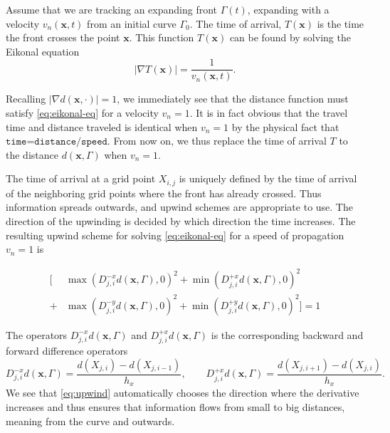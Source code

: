 \begin{definition}
Assume that we are tracking an expanding front $\Gamma(t)$, expanding with a velocity $v_n(\mathbf{x}, t)$ from an initial curve $\Gamma_0$. The time of arrival, $T(\mathbf{x})$ is the time the front crosses the point $\mathbf{x}$. This function $T(\mathbf{x})$ can be found by solving the Eikonal equation \cite{sethian1999level}
\begin{equation}
    |\nabla T(\mathbf{x})| = \frac{1}{v_n(\mathbf{x}, t)}. 
    \label{eq:eikonal-eq}
\end{equation}
\end{definition}
Recalling $|\nabla d(\mathbf{x}, \cdot) | = 1$, we immediately see that the distance function must satisfy \eqref{eq:eikonal-eq} for a velocity $v_n=1$. It is in fact obvious that the travel time and distance traveled is identical when $v_n=1$ by the physical fact that $\texttt{time=distance/speed}$. From now on, we thus replace the time of arrival $T$ to the distance $d(\mathbf{x}, \Gamma)$ when $v_n=1$.

The time of arrival at a grid point $X_{i, j}$ is uniquely defined by the time of arrival of the neighboring grid points where the front has already crossed. Thus information spreads outwards, and upwind schemes are appropriate to use. The direction of the upwinding is decided by which direction the time increases. The resulting upwind scheme \cite{sethian1999level} for solving \eqref{eq:eikonal-eq} for a speed of propagation $v_n = 1$ is

\begin{equation}
\begin{split}
        \big[ &\max (D^{-x}_{j, i} d(\mathbf{x}, \Gamma), 0)^2 + \min (D^{+x}_{j, i} d(\mathbf{x}, \Gamma), 0)^2  \\
    + &\max (D^{-y}_{j, i} d(\mathbf{x}, \Gamma), 0)^2 + \min (D^{+y}_{j, i} d(\mathbf{x}, \Gamma), 0)^2 \big] = 1
    \end{split}
    \label{eq:upwind}
\end{equation}

The operators $D^{-x}_{j, i} d(\mathbf{x}, \Gamma)$ and $D^{+x}_{j, i} d(\mathbf{x}, \Gamma)$ is the corresponding backward and forward difference operators
\begin{equation*}
    D^{-x}_{j, i} d(\mathbf{x}, \Gamma) = \frac{d(X_{j, i})- d(X_{j, i-1})}{h_x}, \qquad D^{+x}_{j, i} d(\mathbf{x}, \Gamma) = \frac{d(X_{j, i+1})- d(X_{j, i})}{h_x}.
\end{equation*}
We see that \eqref{eq:upwind} automatically chooses the direction where the derivative increases and thus ensures that information flows from small to big distances, meaning from the curve and outwards.

